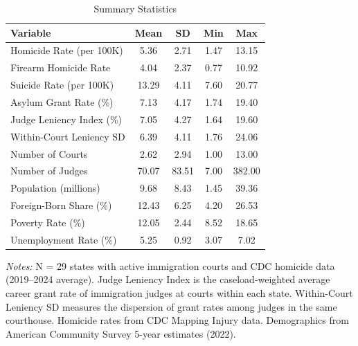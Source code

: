 \begin{table}[H]
\centering
\caption{Summary Statistics}
\begin{threeparttable}
\begin{tabular}{lcccc}
\toprule
Variable & Mean & SD & Min & Max \\
\midrule
Homicide Rate (per 100K) & 5.36 & 2.71 & 1.47 & 13.15 \\
Firearm Homicide Rate & 4.04 & 2.37 & 0.77 & 10.92 \\
Suicide Rate (per 100K) & 13.29 & 4.11 & 7.60 & 20.77 \\
Asylum Grant Rate (\%) & 7.13 & 4.17 & 1.74 & 19.40 \\
Judge Leniency Index (\%) & 7.05 & 4.27 & 1.64 & 19.60 \\
Within-Court Leniency SD & 6.39 & 4.11 & 1.76 & 24.06 \\
Number of Courts & 2.62 & 2.94 & 1.00 & 13.00 \\
Number of Judges & 70.07 & 83.51 & 7.00 & 382.00 \\
Population (millions) & 9.68 & 8.43 & 1.45 & 39.36 \\
Foreign-Born Share (\%) & 12.43 & 6.25 & 4.20 & 26.53 \\
Poverty Rate (\%) & 12.05 & 2.44 & 8.52 & 18.65 \\
Unemployment Rate (\%) & 5.25 & 0.92 & 3.07 & 7.02 \\
\bottomrule
\end{tabular}
\begin{tablenotes}[flushleft]
\small
\item \textit{Notes:} N = 29 states with active immigration courts and CDC homicide data (2019--2024 average).
Judge Leniency Index is the caseload-weighted average career grant rate of immigration judges
at courts within each state. Within-Court Leniency SD measures the dispersion of grant rates
among judges in the same courthouse. Homicide rates from CDC Mapping Injury data.
Demographics from American Community Survey 5-year estimates (2022).
\end{tablenotes}
\end{threeparttable}
\label{tab:summary}
\end{table}
